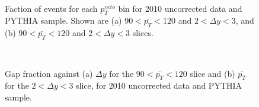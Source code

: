 \begin{figure}
\centering
\mbox{
              \quad
              \quad
                              }
\caption[Comparison between data and PYTHIA sample for Pt3 distribution]{Faction of events for each $p_T^{veto}$ bin for 2010 uncorrected data and PYTHIA sample. Shown are (a) $90<\bar{p_T}<120$ and $2 < \Delta y <3$, and (b) $90<\bar{p_T}<120$ and $2 < \Delta y <3$ slices.\label{Uncorr_Pt3_dy}}
\end{figure}

\begin{figure}
\centering
\mbox{
              \quad
              \quad
                              }
\caption[Comparison of gap fraction between data and PYTHIA sample for $\Delta y$]{Gap fraction against (a) $\Delta y$ for the $90<\bar{p_T}<120$ slice and (b) $\bar{p_T}$ for the $2 < \Delta y <3$ slice, for 2010 uncorrected data and PYTHIA sample.\label{Uncorr_GF}}
\end{figure}


